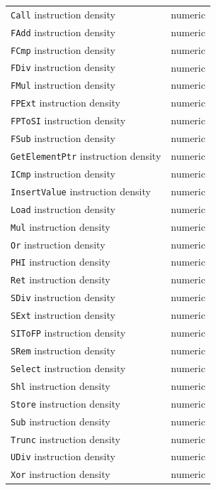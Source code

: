 \begin{table}
\begin{multicols}{2}
\begin{tabular}{p{4.5cm}p{1.3cm}}
    \texttt{Call} instruction density &      numeric \\
    \texttt{FAdd} instruction density &      numeric \\
    \texttt{FCmp} instruction density &      numeric \\
    \texttt{FDiv} instruction density &      numeric \\
    \texttt{FMul} instruction density &      numeric \\
    \texttt{FPExt} instruction density &      numeric \\
    \texttt{FPToSI} instruction density &      numeric \\
    \texttt{FSub} instruction density &      numeric \\
    \texttt{GetElementPtr} instruction density  &      numeric \\
    \texttt{ICmp} instruction density &      numeric \\
    \texttt{InsertValue} instruction density &      numeric \\
    \texttt{Load} instruction density &      numeric \\
    \texttt{Mul} instruction density &      numeric \\
    \texttt{Or} instruction density &      numeric \\
    \texttt{PHI} instruction density &      numeric \\
    \texttt{Ret} instruction density &      numeric \\
    \texttt{SDiv} instruction density &      numeric \\
    \texttt{SExt} instruction density &      numeric \\
    \texttt{SIToFP} instruction density &      numeric \\
    \texttt{SRem} instruction density &      numeric \\
    \texttt{Select} instruction density &      numeric \\
    \texttt{Shl} instruction density &      numeric \\
    \texttt{Store} instruction density &      numeric \\
    \texttt{Sub} instruction density &      numeric \\
    \texttt{Trunc} instruction density &      numeric \\
    \texttt{UDiv} instruction density &      numeric \\
    \texttt{Xor} instruction density &      numeric \\

\end{tabular}
\end{multicols}
\end{table}
